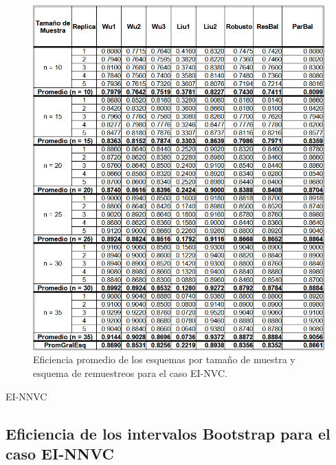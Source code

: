 \begin{figure}[ht] 
	\centering 
	\includegraphics[width=0.9\linewidth]{img/EI_NVC_Efic_Esq.png} 
	\caption{Eficiencia promedio de los esquemas por tamaño de muestra y esquema de remuestreos para el caso EI-NVC.} 
	\label{fig:EI_NVC_Esq}
\end{figure}

EI-NNVC
\subsection{Eficiencia de los intervalos Bootstrap para el caso EI-NNVC}

